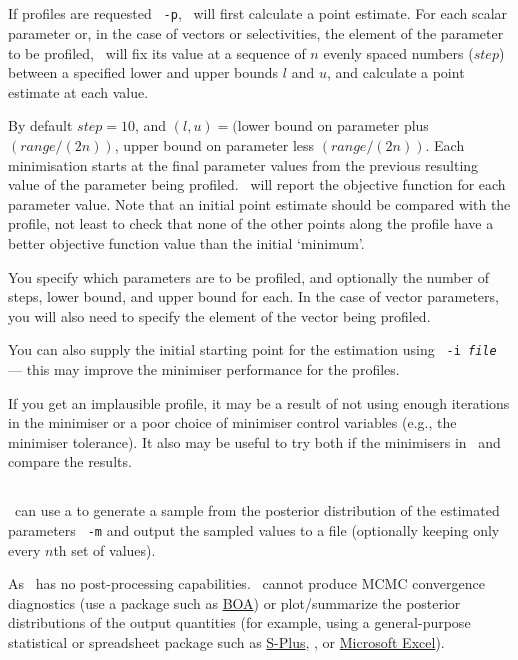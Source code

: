 \subsection{\label{sec:estimate-profiles}}
If profiles are requested \texttt{\cname\ -p}, \CNAME\ will first calculate a point estimate. For each scalar parameter or, in the case of vectors or selectivities, the element of the parameter to be profiled, \CNAME\ will fix its value at a sequence of $n$ evenly spaced numbers ($step$) between a specified lower and upper bounds $l$ and $u$, and calculate a point estimate at each value. 

By default $step=10$, and $(l, u)=($lower bound on parameter plus $(range/(2n))$, upper bound on parameter less $(range/(2n))$. Each minimisation starts at the final parameter values from the previous resulting value of the parameter being profiled. \CNAME\ will report the objective function for each parameter value. Note that an initial point estimate should be compared with the profile, not least to check that none of the other points along the profile have a better objective function value than the initial `minimum'.

You specify which parameters are to be profiled, and optionally the number of steps, lower bound, and upper bound for each. In the case of vector parameters, you will also need to specify the element of the vector being profiled. 

You can also supply the initial starting point for the estimation using \texttt{\cname\ -i \emph{file}} --- this may improve the minimiser performance for the profiles.

If you get an implausible profile, it may be a result of not using enough iterations in the minimiser or a poor choice of minimiser control variables (e.g., the minimiser tolerance). It also may be useful to try both if the minimisers in \CNAME\ and compare the results.

\subsection{\label{sec:estimate-MCMC}}

\CNAME\ can use a  to generate a sample from the posterior distribution of the estimated parameters \texttt{\cname\ -m} and output the sampled values to a file (optionally keeping only every $n$th set of values).

As \CNAME\ has no post-processing capabilities. \CNAME\ cannot produce MCMC convergence diagnostics (use a package such as \href{http://www.public-health.uiowa.edu/boa}{BOA}) or plot/summarize the posterior distributions of the output quantities (for example, using a general-purpose statistical or spreadsheet package such as \href{http://www.insightful.com}{S-Plus}, \href{http://www.r-project.org}{\R}, or \href{http://www.microsoft.com}{Microsoft Excel}).

